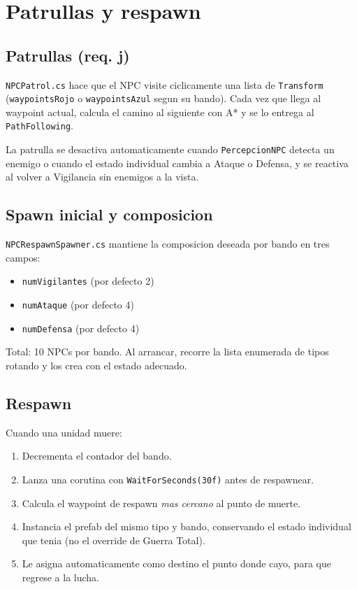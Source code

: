\documentclass[12pt,a4paper]{article}
\begin{document}
\section{Patrullas y respawn}

\subsection{Patrullas (req. j)}

\texttt{NPCPatrol.cs} hace que el NPC visite ciclicamente una lista de
\texttt{Transform} (\texttt{waypointsRojo} o \texttt{waypointsAzul}
segun su bando). Cada vez que llega al waypoint actual, calcula el
camino al siguiente con A* y se lo entrega al \texttt{PathFollowing}.

La patrulla se desactiva automaticamente cuando \texttt{PercepcionNPC}
detecta un enemigo o cuando el estado individual cambia a Ataque o
Defensa, y se reactiva al volver a Vigilancia sin enemigos a la vista.

\subsection{Spawn inicial y composicion}

\texttt{NPCRespawnSpawner.cs} mantiene la composicion deseada por bando
en tres campos:

\begin{itemize}[leftmargin=1.5em]
    \item \texttt{numVigilantes} (por defecto 2)
    \item \texttt{numAtaque} (por defecto 4)
    \item \texttt{numDefensa} (por defecto 4)
\end{itemize}

Total: 10 NPCs por bando. Al arrancar, recorre la lista enumerada de
tipos rotando y los crea con el estado adecuado.

\subsection{Respawn}

Cuando una unidad muere:

\begin{enumerate}[leftmargin=1.5em]
    \item Decrementa el contador del bando.
    \item Lanza una corutina con \texttt{WaitForSeconds(30f)} antes de respawnear.
    \item Calcula el waypoint de respawn \emph{mas cercano} al punto de muerte.
    \item Instancia el prefab del mismo tipo y bando, conservando el estado individual que tenia (no el override de Guerra Total).
    \item Le asigna automaticamente como destino el punto donde cayo, para que regrese a la lucha.
\end{enumerate}
\end{document}
